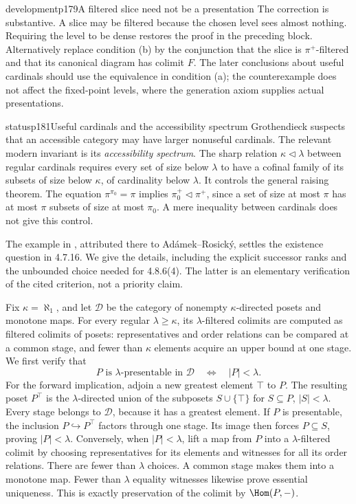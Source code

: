 \begin{dcomment}{development}{p179}{A filtered slice need not be a presentation}
The correction is substantive. A slice may be filtered because the chosen level sees almost nothing. Requiring the level to be dense restores the proof in the preceding block. Alternatively replace condition (b) by the conjunction that the slice is $\pi^+$-filtered and that its canonical diagram has colimit $F$. The later conclusions about useful cardinals should use the equivalence in condition (a); the counterexample does not affect the fixed-point levels, where the generation axiom supplies actual presentations.
\end{dcomment}

\begin{dcomment}{status}{p181}{Useful cardinals and the accessibility spectrum}
Grothendieck suspects that an accessible category may have larger nonuseful cardinals. The relevant modern invariant is its \emph{accessibility spectrum}. The sharp relation $\kappa\mathrel{\triangleleft}\lambda$ between regular cardinals requires every set of size below $\lambda$ to have a cofinal family of its subsets of size below $\kappa$, of cardinality below $\lambda$. It controls the general raising theorem. The equation $\pi^{\pi_0}=\pi$ implies $\pi_0^+\mathrel{\triangleleft}\pi^+$, since a set of size at most $\pi$ has at most $\pi$ subsets of size at most $\pi_0$. A mere inequality between cardinals does not give this control.

The example in \citet[Remark 3.7 and Example 3.8]{Vasey2020Accessible}, attributed there to Ad\'amek--Rosick\'y, settles the existence question in 4.7.16. We give the details, including the explicit successor ranks and the unbounded choice needed for 4.8.6(4). The latter is an elementary verification of the cited criterion, not a priority claim.

Fix $\kappa=\aleph_1$, and let $\mathcal D$ be the category of nonempty $\kappa$-directed posets and monotone maps. For every regular $\lambda\geq\kappa$, its $\lambda$-filtered colimits are computed as filtered colimits of posets: representatives and order relations can be compared at a common stage, and fewer than $\kappa$ elements acquire an upper bound at one stage. We first verify that
\[
 P\text{ is }\lambda\text{-presentable in }\mathcal D
 \quad\Longleftrightarrow\quad |P|<\lambda.
\]
For the forward implication, adjoin a new greatest element $\top$ to $P$. The resulting poset $P^\top$ is the $\lambda$-directed union of the subposets $S\cup\{\top\}$ for $S\subseteq P$, $|S|<\lambda$. Every stage belongs to $\mathcal D$, because it has a greatest element. If $P$ is presentable, the inclusion $P\hookrightarrow P^\top$ factors through one stage. Its image then forces $P\subseteq S$, proving $|P|<\lambda$. Conversely, when $|P|<\lambda$, lift a map from $P$ into a $\lambda$-filtered colimit by choosing representatives for its elements and witnesses for all its order relations. There are fewer than $\lambda$ choices. A common stage makes them into a monotone map. Fewer than $\lambda$ equality witnesses likewise prove essential uniqueness. This is exactly preservation of the colimit by $\Hom(P,-)$.


\end{dcomment}
